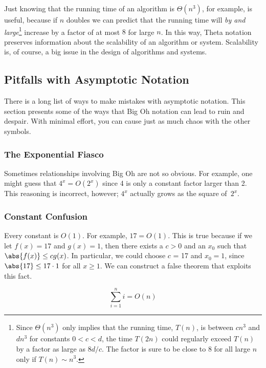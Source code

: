 Just knowing that the running time of an algorithm is $\Theta(n^3)$,
for example, is useful, because if $n$ doubles we can predict that the
running time will \emph{by and large}\footnote{Since $\Theta(n^3)$
  only implies that the running time, $T(n)$, is between $cn^3$ and
  $dn^3$ for constants $0<c<d$, the time $T(2n)$ could regularly
  exceed $T(n)$ by a factor as large as $8d/c$.  The factor is sure to
  be close to 8 for all large $n$ only if $T(n) \sim n^3$.} increase
by a factor of at most $8$ for large $n$.  In this way, Theta notation
preserves information about the scalability of an algorithm or system.
Scalability is, of course, a big issue in the design of algorithms and
systems.


\subsection{Pitfalls with Asymptotic Notation}

There is a long list of ways to make mistakes with asymptotic
notation.  This section presents some of the ways that Big Oh notation
can lead to ruin and despair.  With minimal effort, you can cause just
as much chaos with the other symbols.

\subsubsection{The Exponential Fiasco}

Sometimes relationships involving Big Oh are not so obvious.  For
example, one might guess that $4^x = O(2^x)$ since 4 is only a
constant factor larger than 2.  This reasoning is incorrect, however;
$4^x$ actually grows as the square of~$2^x$.

\subsubsection{Constant Confusion}

Every constant is $O(1)$.  For example, $17 = O(1)$.  This is true because
if we let $f(x) = 17$ and $g(x) = 1$, then there exists a $c > 0$ and an
$x_0$ such that $\abs{f(x)} \leq c g(x)$.  In particular, we could choose
$c$ = 17 and $x_0 = 1$, since $\abs{17} \leq 17 \cdot 1$ for all $x \geq
1$.  We can construct a false theorem that exploits this fact.

\begin{falsethm}
\[
\sum_{i=1}^n i = O(n)
\]
\end{falsethm}

